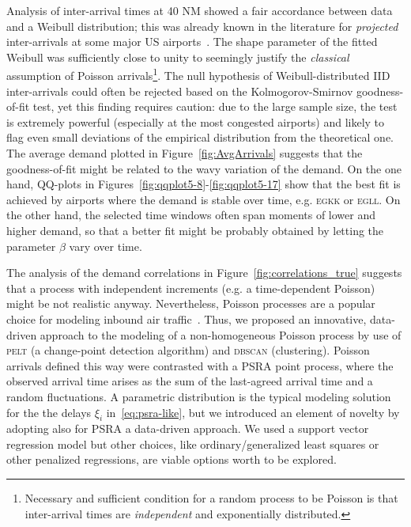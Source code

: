 \documentclass[]{elsarticle}
\makeatletter
\newcommand*{\eg}{e.g.\@\xspace}
\newcommand{\PELT}{\textsc{pelt}}
\newcommand{\DBSCAN}{\textsc{dbscan}}
\newcommand{\airp}[1]{\textcolor{#1}{\textsc{#1}}}
\makeatother
\begin{document}
  Analysis of inter-arrival times at 40 NM showed a fair accordance between data and a Weibull distribution; this was already known in the literature for \emph{projected} inter-arrivals at some major US airports~\citep{willemain2004statistical}.
  The shape parameter of the fitted Weibull was sufficiently close to unity to seemingly justify the \emph{classical} assumption of Poisson arrivals\footnote{Necessary and sufficient condition for a random process to be Poisson is that inter-arrival times are \emph{independent} and exponentially distributed.}.
  The null hypothesis of Weibull-distributed \ac{IID} inter-arrivals could often be rejected based on the Kolmogorov-Smirnov goodness-of-fit test, yet this finding requires caution: due to the large sample size, the test is extremely powerful (especially at the most congested airports) and likely to flag even small deviations of the empirical distribution from the theoretical one.
  The average demand plotted in Figure~\ref{fig:AvgArrivals} suggests that the goodness-of-fit might be related to the wavy variation of the demand.
  On the one hand, QQ-plots in Figures~\ref{fig:qqplot5-8}-\ref{fig:qqplot5-17} show that the best fit is achieved by airports where the demand is stable over time, \eg{} \airp{egkk} or \airp{egll}.
  On the other hand, the selected time windows often span moments of lower and higher demand, so that a better fit might be probably obtained by letting the parameter $\beta$ vary over time.

  The analysis of the demand correlations in Figure~\ref{fig:correlations_true} suggests that a process with independent increments (\eg{} a time-dependent Poisson) might be not realistic anyway.
  Nevertheless, Poisson processes are a popular choice for modeling inbound air traffic~\citet{gwiggner2014data}.
  Thus, we proposed an innovative, data-driven approach to the modeling of a non-homogeneous Poisson process by use of \PELT{} (a change-point detection algorithm) and \DBSCAN{} (clustering).
  Poisson arrivals defined this way were contrasted with a \ac{PSRA} point process, where the observed arrival time arises as the sum of the last-agreed arrival time and a random fluctuations.
  A parametric distribution is the typical modeling solution for the the delays \(\xi_i\) in~\eqref{eq:psra-like}, but we introduced an element of novelty by adopting also for \ac{PSRA} a data-driven approach.
  We used a support vector regression model but other choices, like ordinary/generalized least squares or other penalized regressions, are viable options worth to be explored.
\end{document}
